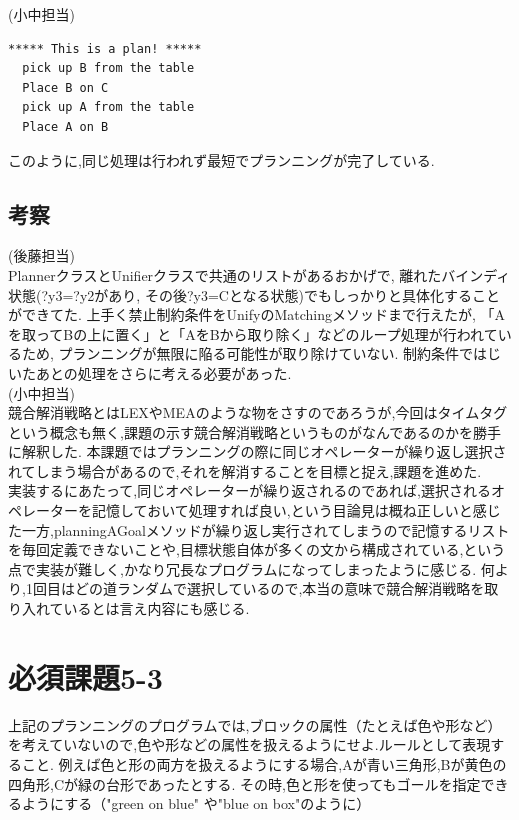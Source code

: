 \documentclass[uplatex,12pt]{jsarticle}
\begin{document}
\noindent (小中担当) \\
\begin{lstlisting}[caption=実行例, label=mid]
  ***** This is a plan! *****
  pick up B from the table
  Place B on C
  pick up A from the table
  Place A on B
  \end{lstlisting}
  このように,同じ処理は行われず最短でプランニングが完了している.


\subsection{考察}
\noindent (後藤担当) \\
PlannerクラスとUnifierクラスで共通のリストがあるおかげで, 離れたバインディ状態(?y3=?y2があり, その後?y3=Cとなる状態)でもしっかりと具体化することができてた. 上手く禁止制約条件をUnifyのMatchingメソッドまで行えたが, 「Aを取ってBの上に置く」と「AをBから取り除く」などのループ処理が行われているため, プランニングが無限に陥る可能性が取り除けていない. 制約条件ではじいたあとの処理をさらに考える必要があった. \\
\noindent (小中担当) \\
競合解消戦略とはLEXやMEAのような物をさすのであろうが,今回はタイムタグという概念も無く,課題の示す競合解消戦略というものがなんであるのかを勝手に解釈した.
本課題ではプランニングの際に同じオペレーターが繰り返し選択されてしまう場合があるので,それを解消することを目標と捉え,課題を進めた.\\
実装するにあたって,同じオペレーターが繰り返されるのであれば,選択されるオペレーターを記憶しておいて処理すれば良い,という目論見は概ね正しいと感じた一方,planningAGoalメソッドが繰り返し実行されてしまうので記憶するリストを毎回定義できないことや,目標状態自体が多くの文から構成されている,という点で実装が難しく,かなり冗長なプログラムになってしまったように感じる.
何より,1回目はどの道ランダムで選択しているので,本当の意味で競合解消戦略を取り入れているとは言え内容にも感じる.


\section{必須課題5-3}
\begin{screen}
    上記のプランニングのプログラムでは,ブロックの属性（たとえば色や形など）を考えていないので,色や形などの属性を扱えるようにせよ.ルールとして表現すること.
    例えば色と形の両方を扱えるようにする場合,Aが青い三角形,Bが黄色の四角形,Cが緑の台形であったとする.
    その時,色と形を使ってもゴールを指定できるようにする（"green on blue" や"blue on box"のように）
\end{screen}
\end{document}
